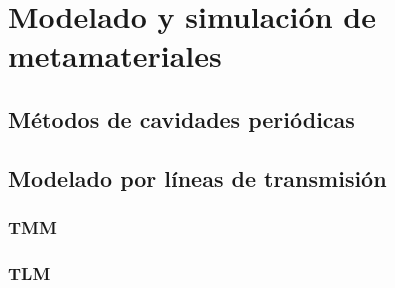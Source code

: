 \section{Modelado y simulación de metamateriales}
\label{sec_simulacion_mtm}
\lipsum
\subsection{Métodos de cavidades periódicas}
\label{subsec_eigenfunctions}
\lipsum
\subsection{Modelado por líneas de transmisión}
\lipsum

\subsubsection{TMM}
\lipsum[2]
\subsubsection{TLM}
\label{subsubsec_tlm}
\lipsum
